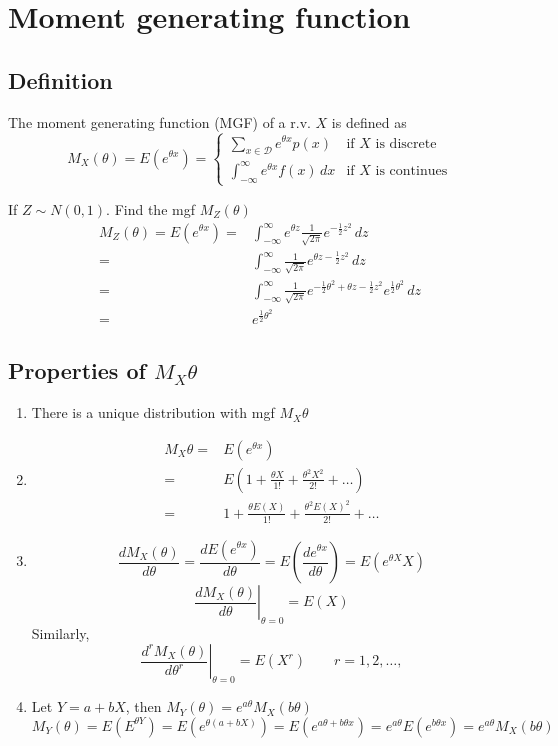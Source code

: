 \appendix
\chapter{Moment generating function}
\section{Definition}
\begin{defn}
The moment generating function (MGF) of a r.v. $X$ is defined as
\[M_X(\theta)=E(e^{\theta x})=\begin{cases}
\sum_{x \in \mathcal{D}} e^{\theta x} p(x) & \text{if }X \text{ is discrete}	\\
\int_{-\infty}^{\infty} e^{\theta x} f(x)\,dx & \text{if }X \text{ is continues}	
\end{cases} \]
\end{defn}

\begin{exmp}
If $Z \sim N(0,1)$. Find the mgf $M_Z(\theta)$
\begin{align*}
M_Z(\theta)=E(e^{\theta x})=& \int_{-\infty}^{\infty} e^{\theta z} \frac{1}{\sqrt{2 \pi}} e^{-\frac{1}{2} z^2} \, dz \\
= & \int_{-\infty}^{\infty}  \frac{1}{\sqrt{2 \pi}} e^{\theta z-\frac{1}{2} z^2} \,dz\\
= & \int_{-\infty}^{\infty}  \frac{1}{\sqrt{2 \pi}} e^{-\frac{1}{2}\theta^2 + \theta z-\frac{1}{2} z^2 } e^{\frac{1}{2}\theta^2} \,dz\\
= & e^{\frac{1}{2} \theta^2}
\end{align*}
\end{exmp}

\section{Properties of $M_X{\theta}$}
\begin{prop}
\begin{enumerate}
\item There is a unique distribution with mgf $M_X{\theta}$
\item \begin{align*}
M_X{\theta}=& E(e^{\theta x}) \\
=& E\left(1+\frac{\theta X}{1!}+ \frac{\theta^2 X^2}{2!}+\dots \right) \\
=& 1+\frac{\theta E(X)}{1!}+ \frac{\theta^2 E(X)^2}{2!}+\dots
\end{align*}
\item 
\[\frac{d M_X(\theta)}{d \theta}=\frac{d E(e^{\theta x})}{d \theta}=E\left(\frac{d e^{\theta x}}{d \theta}\right)=E(e^{\theta X} X)\]
\[\left.\frac{d M_X(\theta)}{d \theta}\right|_{\theta=0}=E(X)\]
Similarly,
\[\left.\frac{d^r M_X(\theta)}{d \theta^r}\right|_{\theta=0}=E(X^r) \qquad r=1,2,\dots,\]
\item Let $Y=a+bX$, then $M_Y(\theta)=e^{a\theta} M_X(b\theta)$
\[M_Y(\theta)=E(E^{\theta Y})=E(e^{\theta (a+bX)})=E(e^{a\theta+b\theta x})=e^{a\theta} E(e^{b\theta x})=e^{a \theta}M_X(b\theta)\]
\end{enumerate}
\end{prop}

